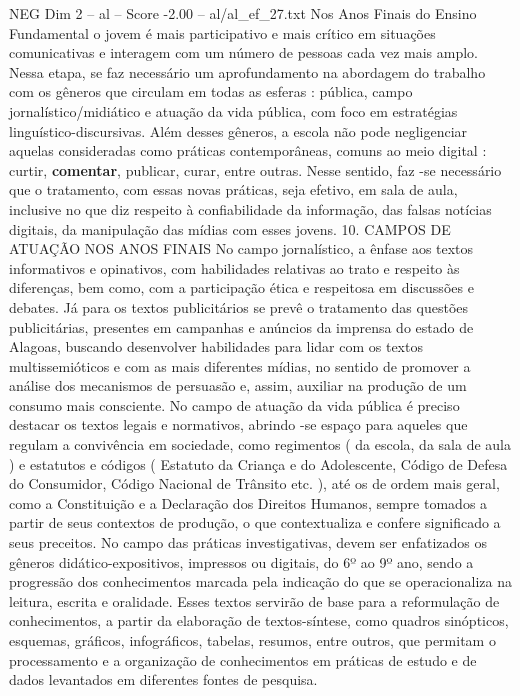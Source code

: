 \begin{textsample}{NEG Dim 2 – al – Score -2.00 – al/al\_ef\_27.txt}  \label{ex:f2_neg_027}
Nos Anos Finais do Ensino Fundamental o jovem é mais participativo e mais crítico em situações comunicativas e interagem com um número de pessoas cada vez mais amplo.
Nessa etapa, se faz necessário um aprofundamento na abordagem do trabalho com os gêneros que circulam em todas as esferas : pública, campo jornalístico/midiático e atuação da vida pública, com foco em estratégias linguístico-discursivas.
Além desses gêneros, a escola não pode negligenciar aquelas consideradas como práticas contemporâneas, comuns ao meio digital : curtir, \textbf{comentar}, publicar, curar, entre outras.
Nesse sentido, faz -se necessário que o tratamento, com essas novas práticas, seja efetivo, em sala de aula, inclusive no que diz respeito à confiabilidade da informação, das falsas notícias digitais, da manipulação das mídias com esses jovens. 10.
CAMPOS DE ATUAÇÃO NOS ANOS FINAIS No campo jornalístico, a ênfase aos textos informativos e opinativos, com habilidades relativas ao trato e respeito às diferenças, bem como, com a participação ética e respeitosa em discussões e debates.
Já para os textos publicitários se prevê o tratamento das questões publicitárias, presentes em campanhas e anúncios da imprensa do estado de Alagoas, buscando desenvolver habilidades para lidar com os textos multissemióticos e com as mais diferentes mídias, no sentido de promover a análise dos mecanismos de persuasão e, assim, auxiliar na produção de um consumo mais consciente.
No campo de atuação da vida pública é preciso destacar os textos legais e normativos, abrindo -se espaço para aqueles que regulam a convivência em sociedade, como regimentos ( da escola, da sala de aula ) e estatutos e códigos ( Estatuto da Criança e do Adolescente, Código de Defesa do Consumidor, Código Nacional de Trânsito etc. ), até os de ordem mais geral, como a Constituição e a Declaração dos Direitos Humanos, sempre tomados a partir de seus contextos de produção, o que contextualiza e confere significado a seus preceitos.
No campo das práticas investigativas, devem ser enfatizados os gêneros didático-expositivos, impressos ou digitais, do 6º ao 9º ano, sendo a progressão dos conhecimentos marcada pela indicação do que se operacionaliza na leitura, escrita e oralidade.
Esses textos servirão de base para a reformulação de conhecimentos, a partir da elaboração de textos-síntese, como quadros sinópticos, esquemas, gráficos, infográficos, tabelas, resumos, entre outros, que permitam o processamento e a organização de conhecimentos em práticas de estudo e de dados levantados em diferentes fontes de pesquisa.

\end{textsample}
